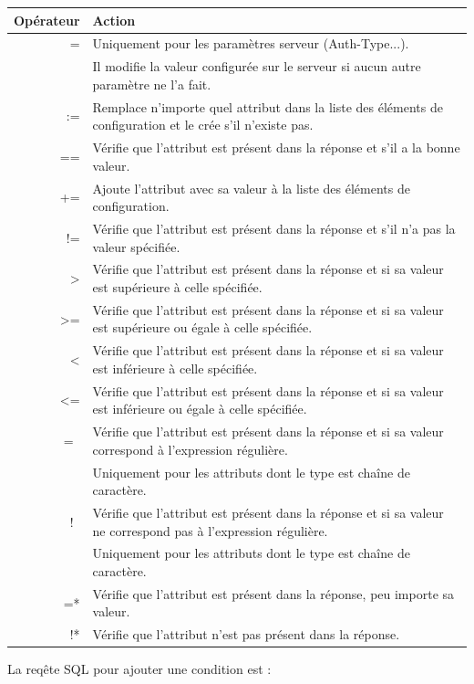 \begin{tabular}{|r|l|}
	\hline
  \textbf{Opérateur} & \textbf{Action} \\
  \hline
  = & Uniquement pour les paramètres serveur (Auth-Type...). \\
	  & Il modifie la valeur configurée sur le serveur si aucun autre paramètre ne l'a fait. \\
  \hline
  := & Remplace n'importe quel attribut dans la liste des éléments de configuration et le crée s'il n'existe pas. \\
  \hline
  == & Vérifie que l'attribut est présent dans la réponse et s'il a la bonne valeur. \\
  \hline
  += & Ajoute l'attribut avec sa valeur à la liste des éléments de configuration. \\
  \hline
  != & Vérifie que l'attribut est présent dans la réponse et s'il n'a pas la valeur spécifiée. \\
  \hline
  > & Vérifie que l'attribut est présent dans la réponse et si sa valeur est supérieure à celle spécifiée. \\
  \hline
  >= & Vérifie que l'attribut est présent dans la réponse et si sa valeur est supérieure ou égale à celle spécifiée. \\
  \hline
  < & Vérifie que l'attribut est présent dans la réponse et si sa valeur est inférieure à celle spécifiée. \\
  \hline
  <= & Vérifie que l'attribut est présent dans la réponse et si sa valeur est inférieure ou égale à celle spécifiée. \\
  \hline
  =~ & Vérifie que l'attribut est présent dans la réponse et si sa valeur correspond à l'expression régulière. \\
		 & Uniquement pour les attributs dont le type est chaîne de caractère. \\
  \hline
  !~ & Vérifie que l'attribut est présent dans la réponse et si sa valeur ne correspond pas à l'expression régulière. \\
		 & Uniquement pour les attributs dont le type est chaîne de caractère. \\
  \hline
  =* & Vérifie que l'attribut est présent dans la réponse, peu importe sa valeur. \\
  \hline
  !* & Vérifie que l'attribut n'est pas présent dans la réponse. \\
	\hline
\end{tabular}

La reqête SQL pour ajouter une condition est :

